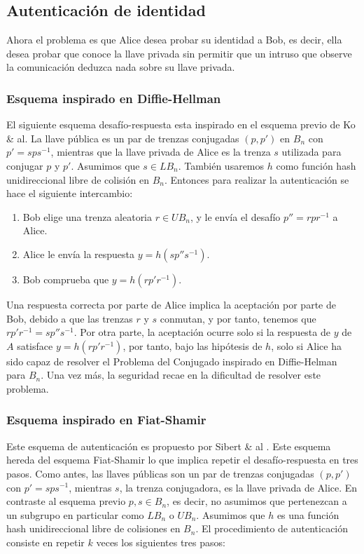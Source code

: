 \documentclass[12pt]{book}
\theoremstyle{definition}
\begin{document}
\subsection{Autenticación de identidad}
Ahora el problema es que Alice desea probar su identidad a Bob, es decir, ella desea probar que conoce la llave privada sin permitir que un intruso que observe la comunicación deduzca nada sobre su llave privada.

\subsubsection*{Esquema inspirado en Diffie-Hellman}

El siguiente esquema desafío-respuesta \cite{Sibert} esta inspirado en el esquema previo de Ko \& al. La llave pública es un par de trenzas conjugadas $(p,p')$ en $B_n$ con $p'=sps^{-1}$, mientras que la llave privada de Alice es la trenza $s$ utilizada para conjugar $p$ y $p'$. Asumimos que $s\in LB_n$. También usaremos $h$ como función hash unidireccional libre de colisión en $B_n$. Entonces para realizar la autenticación se hace el siguiente intercambio:

\begin{enumerate}
\item Bob elige una trenza aleatoria $r\in UB_n$, y le envía el desafío $p''=rpr^{-1}$ a Alice.
\item Alice le envía la respuesta $y = h(sp''s^{-1})$.
\item Bob comprueba que $y=h(rp'r^{-1})$.
\end{enumerate}

Una respuesta correcta por parte de Alice implica la aceptación por parte de Bob, debido a que las trenzas $r$ y $s$ conmutan, y por tanto, tenemos que $rp'r^{-1}=sp''s^{-1}$. Por otra parte, la aceptación ocurre solo si la respuesta de $y$ de $A$ satisface $y=h(rp'r^{-1})$, por tanto, bajo las hipótesis de $h$, solo si Alice ha sido capaz de resolver el Problema del Conjugado inspirado en Diffie-Helman para $B_n$. Una vez más, la seguridad recae en la dificultad de resolver este problema.


\subsubsection*{Esquema inspirado en Fiat-Shamir} Este esquema de autenticación es propuesto por Sibert \& al \cite{Sibert}. Este esquema hereda del esquema Fiat-Shamir lo que implica repetir el desafío-respuesta en tres pasos. Como antes, las llaves públicas son un par de trenzas conjugadas $(p,p')$ con $p'=sps^{-1}$, mientras $s$, la trenza conjugadora, es la llave privada de Alice. En contraste al esquema previo $p,s\in B_n$, es decir, no asumimos que pertenezcan a un subgrupo en particular como $LB_n$ o $UB_n$. Asumimos que $h$ es una función hash unidireccional libre de colisiones en $B_n$. El procedimiento de autenticación consiste en repetir $k$ veces los siguientes tres pasos:
\end{document}
